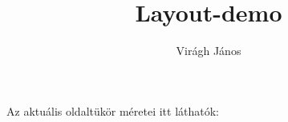 \documentclass{article}
\title{Layout-demo}
\author{Virágh János}
\begin{document}
\maketitle

Az aktuális oldaltükör méretei itt láthatók: \vspace*{2em}

\layout
\end{document}
